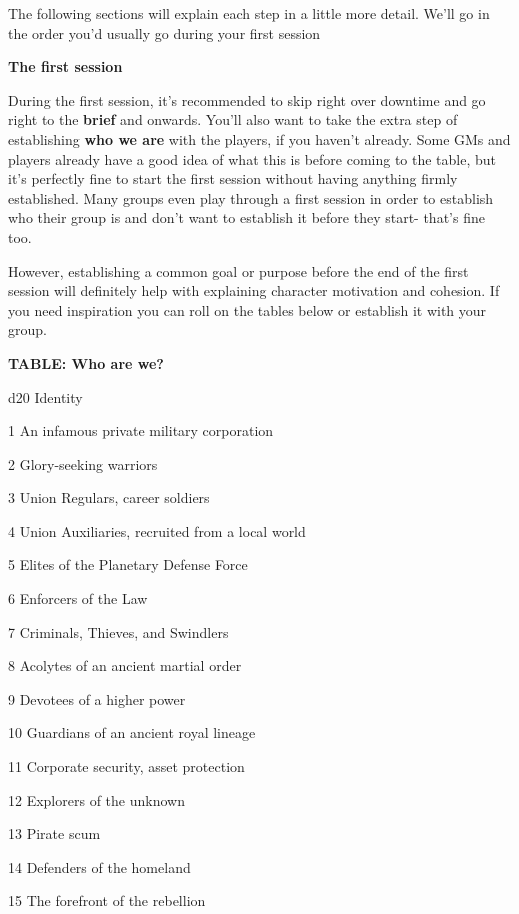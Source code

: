 The following sections will explain each step in a little more detail. We’ll go in the order you’d usually go during your first session

\begin{center}
\textbf{The first session}
\end{center}

During the first session, it’s recommended to skip right over downtime and go right to the \textbf{brief} and onwards. You’ll also want to take the extra step of establishing \textbf{who we are} with the players, if you haven’t already. Some GMs and players already have a good idea of what this is before coming to the table, but it’s perfectly fine to start the first session without having anything firmly established. Many groups even play through a first session in order to establish who their group is and don’t want to establish it before they start- that’s fine too.

However, establishing a common goal or purpose before the end of the first session will definitely help with explaining character motivation and cohesion. If you need inspiration you can roll on the tables below or establish it with your group.

\textbf{TABLE: Who are we?}

 d20       Identity

 1         An infamous private military corporation

 2         Glory-seeking warriors

 3         Union Regulars, career soldiers

 4         Union Auxiliaries, recruited from a local world

 5         Elites of the Planetary Defense Force

 6         Enforcers of the Law

 7         Criminals, Thieves, and Swindlers

 8         Acolytes of an ancient martial order

 9         Devotees of a higher power

  10       Guardians of an ancient royal lineage

  11       Corporate security, asset protection

  12       Explorers of the unknown

  13       Pirate scum

  14       Defenders of the homeland

  15       The forefront of the rebellion

